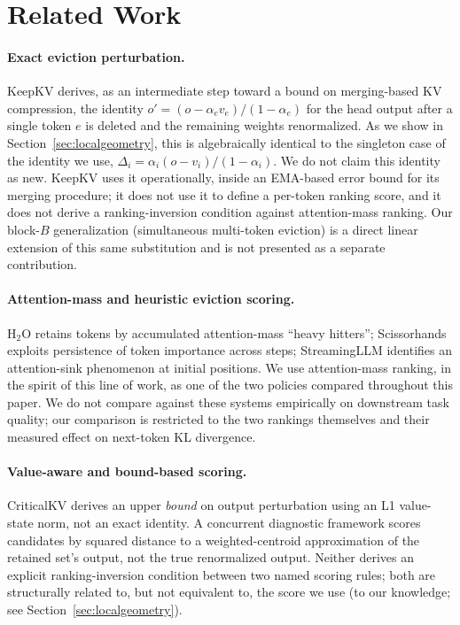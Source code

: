 \documentclass[11pt]{article}
\begin{document}
\section{Related Work}
\label{sec:relatedwork}

\paragraph{Exact eviction perturbation.} KeepKV \cite{keepkv2025} derives,
as an intermediate step toward a bound on merging-based KV compression, the
identity $o' = (o - \alpha_e v_e)/(1-\alpha_e)$ for the head output after a
single token $e$ is deleted and the remaining weights renormalized. As we
show in Section~\ref{sec:localgeometry}, this is algebraically identical to
the singleton case of the identity we use, $\Delta_i = \alpha_i(o-v_i)/(1-\alpha_i)$.
We do not claim this identity as new. KeepKV uses it operationally, inside
an EMA-based error bound for its merging procedure; it does not use it to
define a per-token ranking score, and it does not derive a ranking-inversion
condition against attention-mass ranking. Our block-$B$ generalization
(simultaneous multi-token eviction) is a direct linear extension of this
same substitution and is not presented as a separate contribution.

\paragraph{Attention-mass and heuristic eviction scoring.} H$_2$O
\cite{h2o2023} retains tokens by accumulated attention-mass ``heavy
hitters''; Scissorhands \cite{scissorhands2023} exploits persistence of
token importance across steps; StreamingLLM \cite{streamingllm2024}
identifies an attention-sink phenomenon at initial positions. We use
attention-mass ranking, in the spirit of this line of work, as one of the
two policies compared throughout this paper. We do not compare against
these systems empirically on downstream task quality; our comparison is
restricted to the two rankings themselves and their measured effect on
next-token KL divergence.

\paragraph{Value-aware and bound-based scoring.} CriticalKV \cite{criticalkv2025}
derives an upper \emph{bound} on output perturbation using an L1 value-state
norm, not an exact identity. A concurrent diagnostic framework
\cite{fixedcontract2026} scores candidates by squared distance to a
weighted-centroid approximation of the retained set's output, not the true
renormalized output. Neither derives an explicit ranking-inversion condition
between two named scoring rules; both are structurally related to, but not
equivalent to, the score we use (to our knowledge; see
Section~\ref{sec:localgeometry}).
\end{document}
